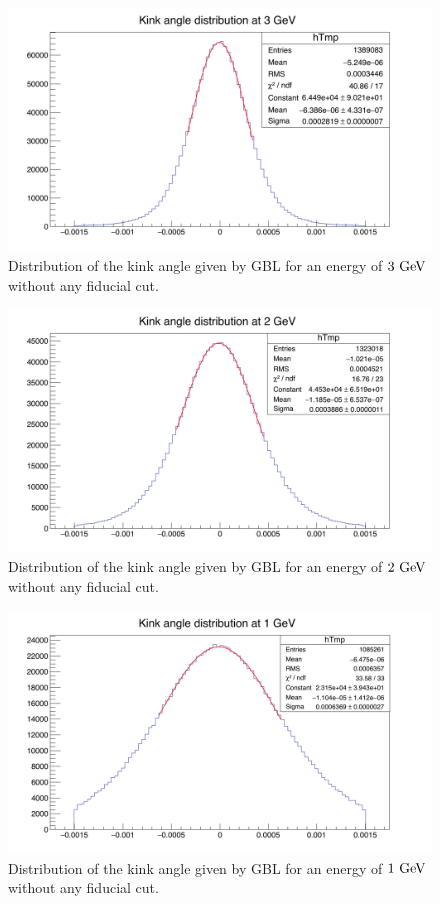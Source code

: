    \begin{figure}[!p]
     \centering
     \includegraphics[width = \textwidth]{Pictures/X0/kinkAngle3GeV.png}
     \caption{Distribution of the kink angle given by GBL for an energy of $3~\rm{GeV}$ without any fiducial cut.}
     \label{fig:kinkAngle3GeV}
   \end{figure} 

   \begin{figure}[!p]
     \centering
     \includegraphics[width = \textwidth]{Pictures/X0/kinkAngle2GeV.png}
     \caption{Distribution of the kink angle given by GBL for an energy of $2~\rm{GeV}$ without any fiducial cut.}
     \label{fig:kinkAngle2GeV}
   \end{figure} 

   \begin{figure}[!p]
     \centering
     \includegraphics[width = \textwidth]{Pictures/X0/kinkAngle1GeV.png}
     \caption{Distribution of the kink angle given by GBL for an energy of $1~\rm{GeV}$ without any fiducial cut.}
     \label{fig:kinkAngle1GeV}
   \end{figure} 

